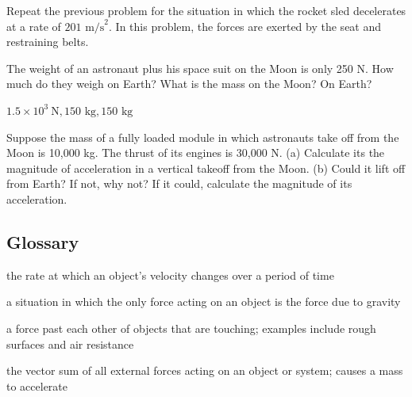 \documentclass[
]{book}
\providecommand{\tightlist}{%
  \setlength{\itemsep}{0pt}\setlength{\parskip}{0pt}}
\newenvironment{problems-exercises}{}{}
\begin{document}
\begin{problems-exercises}
\hypertarget{fs-id1849611}{}
\leavevmode\hypertarget{fs-id3127797}{}%
Repeat the previous problem for the situation in which the rocket sled
decelerates at a rate of \({2\text{01\ m/s}^{2}}{}\). In this problem, the
forces are exerted by the seat and restraining belts.

\hypertarget{fs-id3244376}{}
\leavevmode\hypertarget{fs-id1405768}{}%
The weight of an astronaut plus his space suit on the Moon is only 250
N. How much do they weigh on Earth? What is the mass on the Moon? On
Earth?

\leavevmode\hypertarget{eip-id1480319}{}%
\(1.5 \times 10^{3}\ \text{N},\text{150\ kg},\text{150\ kg}\)

\hypertarget{fs-id1418924}{}
\leavevmode\hypertarget{fs-id2667164}{}%
Suppose the mass of a fully loaded module in which astronauts take off
from the Moon is 10,000 kg. The thrust of its engines is 30,000 N. (a)
Calculate its the magnitude of acceleration in a vertical takeoff from
the Moon. (b) Could it lift off from Earth? If not, why not? If it
could, calculate the magnitude of its acceleration.

\end{problems-exercises}

\hypertarget{glossary-13}{%
\subsection{Glossary}\label{glossary-13}}

\begin{description}
\tightlist
\item[acceleration]
the rate at which an object's velocity changes over a period of time
\end{description}

\begin{description}
\tightlist
\item[free-fall]
a situation in which the only force acting on an object is the force
due to gravity
\end{description}

\begin{description}
\tightlist
\item[friction]
a force past each other of objects that are touching; examples
include rough surfaces and air resistance
\end{description}

\begin{description}
\tightlist
\item[net external force]
the vector sum of all external forces acting on an object or system;
causes a mass to accelerate
\end{description}
\end{document}
